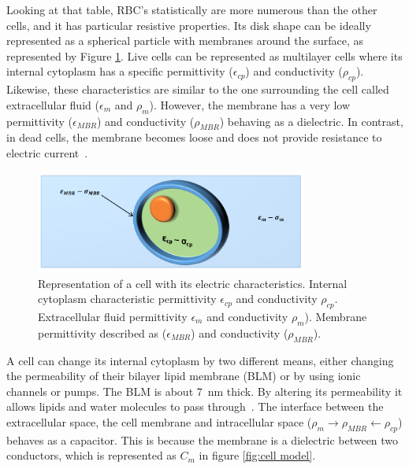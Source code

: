 Looking at that table, RBC's statistically are more numerous than the other cells, and it has particular resistive properties. Its disk shape can be ideally represented as a spherical particle with membranes around the surface, as represented by Figure \ref{fig:cell}. Live cells can be represented as multilayer cells where its internal cytoplasm has a specific permittivity ($\epsilon_{cp}$) and conductivity ($\rho_{cp}$). Likewise, these characteristics are similar to the one surrounding the cell called extracellular fluid ($\epsilon_m$ and $\rho_m$). However, the membrane has a very low permittivity ($\epsilon_{MBR}$) and conductivity ($\rho_{MBR}$) behaving as a dielectric. In contrast, in dead cells, the membrane becomes loose and does not provide resistance to electric current~\cite{lvovich2012impedance}.

\begin{figure}[!htpb]
	\centering
	\includegraphics[width=0.8\textwidth,keepaspectratio, trim={0cm 0cm 0cm 0cm},clip]{figure1}    
	\caption[Cell permeability and conductivity distribution]{Representation of a cell with its electric characteristics. Internal cytoplasm characteristic permittivity $\epsilon_{cp}$ and conductivity $\rho_{cp}$. Extracellular fluid permittivity $\epsilon_m$ and conductivity $\rho_m$). Membrane permittivity described as ($\epsilon_{MBR}$) and conductivity ($\rho_{MBR}$).}
	\label{fig:cell}
\end{figure}

A cell can change its internal cytoplasm by two different means, either changing the permeability of their bilayer lipid membrane (BLM) or by using ionic channels or pumps. The BLM is about \SI{7}{\nano\meter} thick. By altering its permeability it allows lipids and water molecules to pass through~\cite{ivorra2003bioimpedance}. The interface between the extracellular space, the cell membrane and intracellular space ($\rho_m \rightarrow \rho_{MBR} \leftarrow \rho_{cp}$) behaves as a capacitor. This is because the membrane is a dielectric between two conductors, which is represented as $C_m$ in figure \ref{fig:cell model}.

